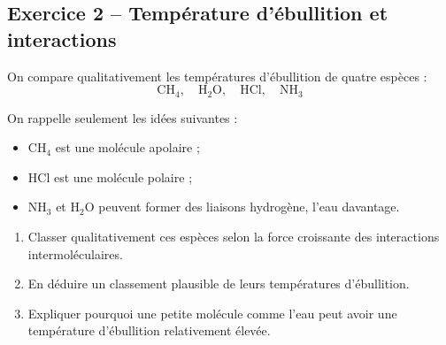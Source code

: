 \documentclass[11pt,a4paper]{article}
\begin{document}
\subsection{Exercice 2 -- Température d'ébullition et interactions}

\begin{enoncebox}
On compare qualitativement les températures d'ébullition de quatre espèces :
\[
\mathrm{CH_4},\quad \mathrm{H_2O},\quad \mathrm{HCl},\quad \mathrm{NH_3}
\]

On rappelle seulement les idées suivantes :
\begin{itemize}
    \item \(\mathrm{CH_4}\) est une molécule apolaire ;
    \item \(\mathrm{HCl}\) est une molécule polaire ;
    \item \(\mathrm{NH_3}\) et \(\mathrm{H_2O}\) peuvent former des liaisons hydrogène, l'eau davantage.
\end{itemize}

\begin{enumerate}[label=\arabic*)]
    \item Classer qualitativement ces espèces selon la force croissante des interactions intermoléculaires.
    \item En déduire un classement plausible de leurs températures d'ébullition.
    \item Expliquer pourquoi une petite molécule comme l'eau peut avoir une température d'ébullition relativement élevée.
\end{enumerate}
\end{enoncebox}
\end{document}
